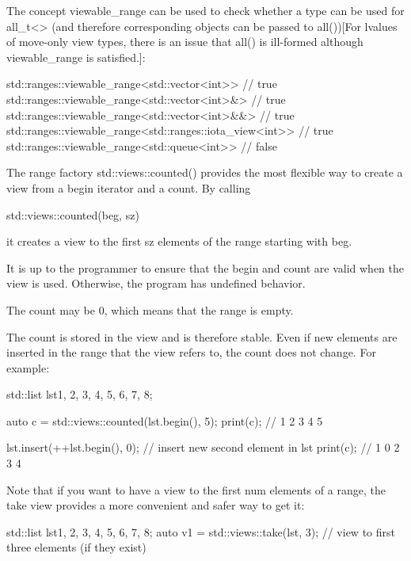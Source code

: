 The concept viewable\_range can be used to check whether a type can be used for all\_t<> (and therefore corresponding objects can be passed to all())[For lvalues of move-only view types, there is an issue that all() is ill-formed although viewable\_range is satisfied.]:

\begin{cpp}
std::ranges::viewable_range<std::vector<int>> // true
std::ranges::viewable_range<std::vector<int>&> // true
std::ranges::viewable_range<std::vector<int>&&> // true
std::ranges::viewable_range<std::ranges::iota_view<int>> // true
std::ranges::viewable_range<std::queue<int>> // false
\end{cpp}


The range factory std::views::counted() provides the most flexible way to create a view from a begin iterator and a count. By calling

\begin{cpp}
std::views::counted(beg, sz)
\end{cpp}

it creates a view to the first sz elements of the range starting with beg.

It is up to the programmer to ensure that the begin and count are valid when the view is used. Otherwise, the program has undefined behavior.

The count may be 0, which means that the range is empty.

The count is stored in the view and is therefore stable. Even if new elements are inserted in the range that the view refers to, the count does not change. For example:

\begin{cpp}
std::list lst{1, 2, 3, 4, 5, 6, 7, 8};

auto c = std::views::counted(lst.begin(), 5);
print(c); // 1 2 3 4 5

lst.insert(++lst.begin(), 0); // insert new second element in lst
print(c); // 1 0 2 3 4
\end{cpp}

Note that if you want to have a view to the first num elements of a range, the take view provides a more convenient and safer way to get it:

\begin{cpp}
std::list lst{1, 2, 3, 4, 5, 6, 7, 8};
auto v1 = std::views::take(lst, 3); // view to first three elements (if they exist)
\end{cpp}

